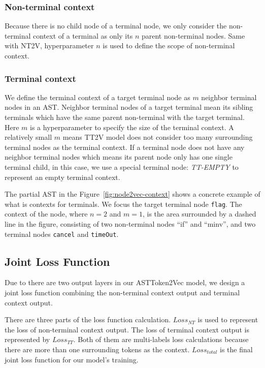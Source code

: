 \documentclass[E]{compsoft}
\begin{document}
\subsubsection{Non-terminal context} 
Because there is no child node of a terminal node, we only consider the non-terminal context of a terminal as only its $n$ parent non-terminal nodes. 
Same with NT2V, hyperparameter $n$ is used to define the scope of non-terminal context.

\subsubsection{Terminal context} 
We define the terminal context of a target terminal node as $m$ neighbor terminal nodes in an AST. 
Neighbor terminal nodes of a target terminal mean its sibling terminals which have the same parent non-terminal with the target terminal.
Here $m$ is a hyperparameter to specify the size of the terminal context. 
A relatively small $m$ means TT2V model does not consider too many surrounding terminal nodes as the terminal context. 
If a terminal node does not have any neighbor terminal nodes which means its parent node only has one single terminal child, in this case, we use a special terminal node: \textit{TT-EMPTY} to represent an empty terminal context. 

The partial AST in the Figure~\ref{fig:node2vec-context} shows a concrete example of what is contexts for terminals.
We focus the target terminal node \texttt{flag}.   The context of the node, where $n=2$ and $m=1$, is the area surrounded by a dashed line in the figure, consisting of two non-terminal nodes ``if'' and ``minv'', and two terminal nodes \texttt{cancel} and \texttt{timeOut}.

\subsection{Joint Loss Function}
Due to there are two output layers in our ASTToken2Vec model, we design a joint loss function combining the non-terminal context output and terminal context output. 

There are three parts of the loss function calculation. 
$\mathit{Loss}_{\mathit{NT}}$ is used to represent the loss of non-terminal context output. 
The loss of terminal context output is represented by $\mathit{Loss}_{\mathit{TT}}$. 
Both of them are multi-labels loss calculations because there are more than one surrounding tokens as the context. 
 $\mathit{Loss}_{\mathit{total}}$ is the final joint loss function for our model's training.
\end{document}

